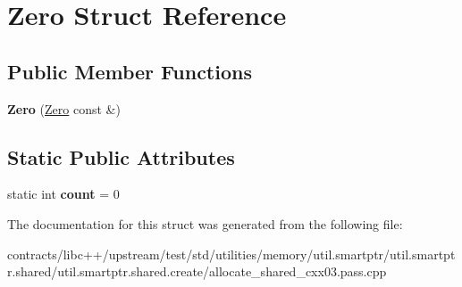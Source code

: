 \hypertarget{struct_zero}{}\section{Zero Struct Reference}
\label{struct_zero}
\subsection*{Public Member Functions}
\begin{DoxyCompactItemize}
\item 
\mbox{\label{struct_zero_ac7a4bdb73c8ea76326c39826b9afd7d2}} 
{\bfseries Zero} (\mbox{\hyperlink{struct_zero}{Zero}} const \&)
\end{DoxyCompactItemize}
\subsection*{Static Public Attributes}
\begin{DoxyCompactItemize}
\item 
\mbox{\label{struct_zero_a0bbe089ac1ab735ae386a84dd5861265}} 
static int {\bfseries count} = 0
\end{DoxyCompactItemize}


The documentation for this struct was generated from the following file\+:\begin{DoxyCompactItemize}
\item 
contracts/libc++/upstream/test/std/utilities/memory/util.\+smartptr/util.\+smartptr.\+shared/util.\+smartptr.\+shared.\+create/allocate\+\_\+shared\+\_\+cxx03.\+pass.\+cpp\end{DoxyCompactItemize}
